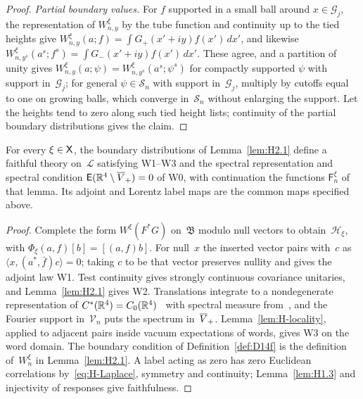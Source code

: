 \begin{proof}
\emph{Partial boundary values.} For $f$ supported in a small ball around $x\in\mathcal G_j$, the representation of $W^\xi_{n,y}$ by the tube function and continuity up to the tied heights give $W^\xi_{n,y}(a;f)=\int G_+(x'+iy)f(x')\,dx'$, and likewise $W^\xi_{n,y^s}(a^s;f^s)=\int G_-(x'+iy)f(x')\,dx'$. These agree, and a partition of unity gives $W^\xi_{n,y}(a;\psi)=W^\xi_{n,y^s}(a^s;\psi^s)$ for compactly supported $\psi$ with support in~$\mathcal G_j$; for general $\psi\in\mathcal S_n$ with support in~$\mathcal G_j$, multiply by cutoffs equal to one on growing balls, which converge in~$\mathcal S_n$ without enlarging the support. Let the heights tend to zero along such tied height lists; continuity of the partial boundary distributions gives the claim.
\end{proof}

\begin{lemma}\label{lem:H-fields}
For every $\xi\in\mathsf{X}$, the boundary distributions of Lemma~\ref{lem:H2.1} define a faithful theory on~$\mathcal L$ satisfying W1--W3 and the spectral representation and spectral condition $\mathsf E(\mathbb{R}^4\setminus\overline{V}_+)=0$ of W0, with continuation the functions $\mathsf F^\xi_n$ of that lemma. Its adjoint and Lorentz label maps are the common maps specified above.
\end{lemma}
\begin{proof}
Complete the form $W^\xi(F^*G)$ on~$\mathfrak B$ modulo null vectors to obtain~$\mathcal H_\xi$, with $\Phi_\xi(a,f)[b]=[(a,f)b]$. For null~$x$ the inserted vector pairs with~$c$ as $\langle x,(a^*,\bar f)c\rangle=0$; taking $c$ to be that vector preserves nullity and gives the adjoint law W1. Test continuity gives strongly continuous covariance unitaries, and Lemma~\ref{lem:H2.1} gives W2. Translations integrate to a nondegenerate representation of $C^*(\mathbb{R}^4)=C_0(\mathbb{R}^4)$~\cite[Theorem~3.7.11 and equation~(3.89)]{Landsman1998} with spectral measure from~\cite[Proposition~4.2.3]{Landsman1998}, and the Fourier support in~$\mathcal V_n$ puts the spectrum in~$\overline{V}_+$. Lemma~\ref{lem:H-locality}, applied to adjacent pairs inside vacuum expectations of words, gives W3 on the word domain. The boundary condition of Definition~\ref{def:D14f} is the definition of~$W^\xi_n$ in Lemma~\ref{lem:H2.1}. A label acting as zero has zero Euclidean correlations by~\eqref{eq:H-Laplace}, symmetry and continuity; Lemma~\ref{lem:H1.3} and injectivity of responses give faithfulness.
\end{proof}

